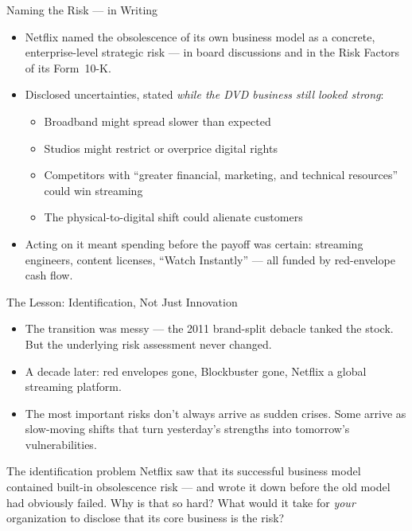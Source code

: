 \documentclass[11pt, aspectratio=169]{beamer}
\begin{document}
\begin{frame}{Naming the Risk --- in Writing}
\begin{itemize}
  \item Netflix named the obsolescence of its own business model as a concrete, enterprise-level \alert{strategic risk} --- in board discussions and in the Risk Factors of its Form~10-K.
  \item Disclosed uncertainties, stated \emph{while the DVD business still looked strong}:
  \begin{itemize}
    \item Broadband might spread slower than expected
    \item Studios might restrict or overprice digital rights
    \item Competitors with ``greater financial, marketing, and technical resources'' could win streaming
    \item The physical-to-digital shift could alienate customers
  \end{itemize}
  \item Acting on it meant spending before the payoff was certain: streaming engineers, content licenses, ``Watch Instantly'' --- all funded by red-envelope cash flow.
\end{itemize}
\end{frame}

\begin{frame}{The Lesson: Identification, Not Just Innovation}
\begin{itemize}
  \item The transition was messy --- the 2011 brand-split debacle tanked the stock. But the underlying risk assessment never changed.
  \item A decade later: red envelopes gone, Blockbuster gone, Netflix a global streaming platform.
  \item The most important risks don't always arrive as sudden crises. Some arrive as \alert{slow-moving shifts} that turn yesterday's strengths into tomorrow's vulnerabilities.
\end{itemize}
\medskip
\begin{block}{The identification problem}
Netflix saw that its successful business model contained built-in obsolescence risk --- and wrote it down before the old model had obviously failed. Why is that so hard? What would it take for \emph{your} organization to disclose that its core business is the risk?
\end{block}
\end{frame}
\end{document}
